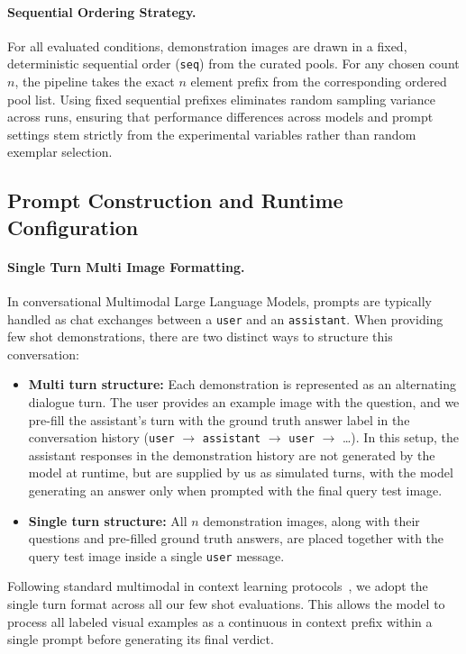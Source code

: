 \paragraph{Sequential Ordering Strategy.}
For all evaluated conditions, demonstration images are drawn in a fixed, deterministic sequential order (\texttt{seq}) from the curated pools. For any chosen count $n$, the pipeline takes the exact $n$ element prefix from the corresponding ordered pool list. Using fixed sequential prefixes eliminates random sampling variance across runs, ensuring that performance differences across models and prompt settings stem strictly from the experimental variables rather than random exemplar selection.

\subsection{Prompt Construction and Runtime Configuration}
\label{subsec:fewshot_prompt_construction}

\paragraph{Single Turn Multi Image Formatting.}
In conversational Multimodal Large Language Models, prompts are typically handled as chat exchanges between a \texttt{user} and an \texttt{assistant}. When providing few shot demonstrations, there are two distinct ways to structure this conversation:
\begin{itemize}
    \item \textbf{Multi turn structure:} Each demonstration is represented as an alternating dialogue turn. The user provides an example image with the question, and we pre-fill the assistant's turn with the ground truth answer label in the conversation history (\texttt{user} $\to$ \texttt{assistant} $\to$ \texttt{user} $\to$ \dots). In this setup, the assistant responses in the demonstration history are not generated by the model at runtime, but are supplied by us as simulated turns, with the model generating an answer only when prompted with the final query test image.
    \item \textbf{Single turn structure:} All $n$ demonstration images, along with their questions and pre-filled ground truth answers, are placed together with the query test image inside a single \texttt{user} message.
\end{itemize}
Following standard multimodal in context learning protocols~\cite{dogan2026fewmmbench,qin2024whatfactors}, we adopt the single turn format across all our few shot evaluations. This allows the model to process all labeled visual examples as a continuous in context prefix within a single prompt before generating its final verdict.

